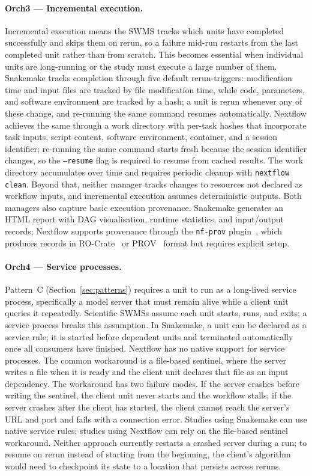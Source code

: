 \documentclass{eceasst}
\begin{document}
\paragraph{Orch3 --- Incremental execution.}
Incremental execution means the SWMS tracks which units have
completed successfully and skips them on rerun, so a failure mid-run restarts
from the last completed unit rather than from scratch. This becomes essential when individual units are long-running or the study must
execute a large number of them. Snakemake tracks completion through five default rerun-triggers: modification
time and input files are tracked by file modification time, while code,
parameters, and software environment are tracked by a hash; a unit is rerun
whenever any of these change, and re-running the same command resumes
automatically. Nextflow achieves the same through a work directory with
per-task hashes that incorporate task inputs, script content, software
environment, container, and a session identifier; re-running the same command
starts fresh because the session identifier changes, so the \texttt{--resume}
flag is required to resume from cached results. The work directory accumulates
over time and requires periodic cleanup with \texttt{nextflow clean}.
Beyond that, neither manager tracks changes to resources not declared as
workflow inputs, and incremental execution assumes deterministic outputs. Both managers also capture basic
execution provenance. Snakemake generates
an HTML report with DAG visualisation, runtime statistics, and input/output
records; Nextflow supports provenance through the \texttt{nf-prov} plugin~\cite{nfprov},
which produces records in RO-Crate~\cite{soilandreyes2022rocrate} or PROV~\cite{lebo2013provo} format but requires explicit
setup.

\paragraph{Orch4 --- Service processes.}
Pattern~C (Section~\ref{sec:patterns}) requires a unit to run as a long-lived
service process, specifically a model server that must remain alive while a
client unit queries it repeatedly. Scientific SWMSs assume each
unit starts, runs, and exits; a service process breaks this assumption. In
Snakemake, a unit can be declared as a service rule; it is started before
dependent units and terminated automatically once all consumers have finished.
Nextflow has no native support for service processes. The common
workaround is a file-based sentinel, where the server writes a file when it is
ready and the client unit declares that file as an input dependency. The
workaround has two failure modes. If the server crashes before writing the
sentinel, the client unit never starts and the workflow stalls; if the server
crashes after the client has started, the client cannot reach the server's URL
and port and fails with a connection error. Studies using Snakemake can use
native service rules; studies using Nextflow can rely on the file-based sentinel
workaround. Neither approach currently restarts a crashed server during a run;
to resume on rerun instead of starting from the beginning, the client's algorithm
would need to checkpoint its state to a location that persists across reruns.
\end{document}
